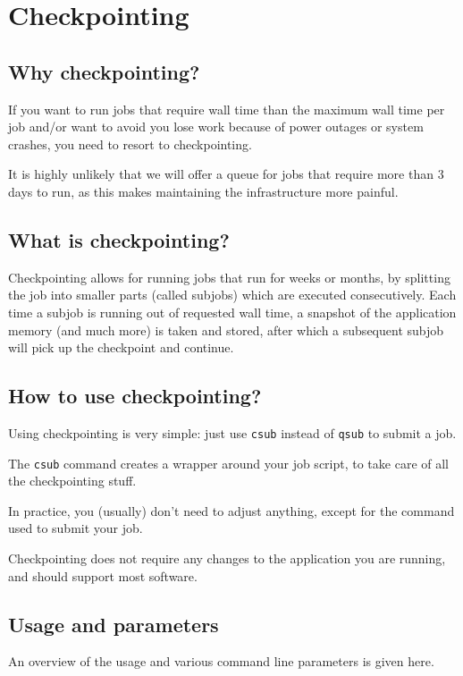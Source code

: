 \chapter{Checkpointing}
\label{ch:checkpointing}
\section{Why checkpointing?}
If you want to run jobs that require wall time than the maximum wall time per job
and/or want to avoid you lose work because of power outages or system crashes,
you need to resort to checkpointing.

\ifgent
It is highly unlikely that we will offer a queue for jobs that require more
than 3 days to run, as this makes maintaining the infrastructure more painful.
\fi


\section{What is checkpointing?}

Checkpointing allows for running jobs that run for weeks or months, by splitting
the job into smaller parts (called subjobs) which are executed consecutively.
Each time a subjob is running out of requested wall time, a snapshot of the
application memory (and much more) is taken and stored, after which a subsequent
subjob will pick up the checkpoint and continue.

\section{How to use checkpointing?}

Using checkpointing is very simple: just use \lstinline|csub| instead of \lstinline|qsub| to submit a job.

The \lstinline|csub| command creates a wrapper around your job script, to take care
of all the checkpointing stuff.

In practice, you (usually) don't need to adjust anything, except for the command used to submit your job.

Checkpointing does not require any changes to the application you are running, and should support most software.

\section{Usage and parameters}

An overview of the usage and various command line parameters is given here.

